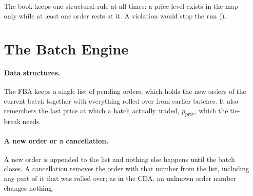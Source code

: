 The book keeps one structural rule at all times: a price level exists in
the map only while at least one order rests at it. A violation would stop
the run ().

\section{The Batch Engine}
\label{sec:implfba}

\paragraph{Data structures.} The FBA keeps a single list of pending orders,
which holds the new orders of the current batch together with everything
rolled over from earlier batches. It also remembers the last price at which
a batch actually traded, $p_{\mathrm{prev}}$, which the tie-break needs.

\paragraph{A new order or a cancellation.} A new order is appended to the
list and nothing else happens until the batch closes. A cancellation
removes the order with that number from the list, including any part of it
that was rolled over; as in the CDA, an unknown order number changes
nothing.

